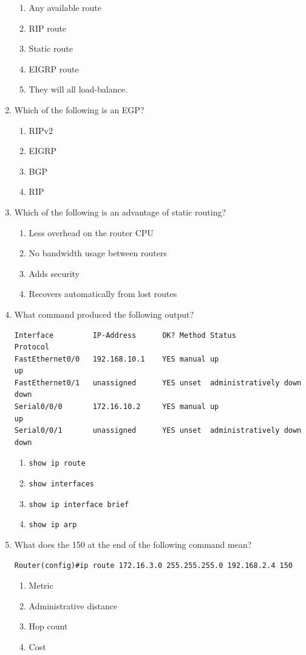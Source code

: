 \begin{enumerate}
  \begin{enumerate}
  \tightlist
  \item
    Any available route
  \item
    RIP route
  \item
    Static route
  \item
    EIGRP route
  \item
    They will all load-balance.
  \end{enumerate}
\item
  Which of the following is an EGP?

  \begin{enumerate}
  \tightlist
  \item
    RIPv2
  \item
    EIGRP
  \item
    BGP
  \item
    RIP
  \end{enumerate}
\item
  \protect\hypertarget{c09.xhtmlux5cux23Page_409}{}{}Which of the
  following is an advantage of static routing?

  \begin{enumerate}
  \tightlist
  \item
    Less overhead on the router CPU
  \item
    No bandwidth usage between routers
  \item
    Adds security
  \item
    Recovers automatically from lost routes
  \end{enumerate}
\item
  What command produced the following output?

\begin{verbatim}
Interface         IP-Address      OK? Method Status             Protocol
FastEthernet0/0   192.168.10.1    YES manual up                    up
FastEthernet0/1   unassigned      YES unset  administratively down down
Serial0/0/0       172.16.10.2     YES manual up                    up
Serial0/0/1       unassigned      YES unset  administratively down down
\end{verbatim}

  \begin{enumerate}
  \tightlist
  \item
    \texttt{show\ ip\ route}
  \item
    \texttt{show\ interfaces}
  \item
    \texttt{show\ ip\ interface\ brief}
  \item
    \texttt{show\ ip\ arp}
  \end{enumerate}
\item
  What does the 150 at the end of the following command mean?

\begin{verbatim}
Router(config)#ip route 172.16.3.0 255.255.255.0 192.168.2.4 150
\end{verbatim}

  \begin{enumerate}
  \tightlist
  \item
    Metric
  \item
    Administrative distance
  \item
    Hop count
  \item
    Cost
  \end{enumerate}
\end{enumerate}
